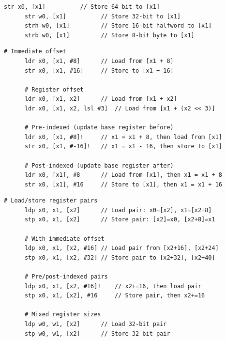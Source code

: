   \begin{definition}
    \label{def:basic-store-operations}
    \begin{lstlisting}[language=arm]
      str x0, [x1]          // Store 64-bit to [x1]
      str w0, [x1]          // Store 32-bit to [x1]
      strh w0, [x1]         // Store 16-bit halfword to [x1]
      strb w0, [x1]         // Store 8-bit byte to [x1]
    \end{lstlisting}
  \end{definition}

  \begin{definition}
    \label{def:addressing-modes}
    \begin{lstlisting}[language=arm]
      # Immediate offset
      ldr x0, [x1, #8]      // Load from [x1 + 8]
      str x0, [x1, #16]     // Store to [x1 + 16]
      
      # Register offset
      ldr x0, [x1, x2]      // Load from [x1 + x2]
      ldr x0, [x1, x2, lsl #3]  // Load from [x1 + (x2 << 3)]
      
      # Pre-indexed (update base register before)
      ldr x0, [x1, #8]!     // x1 = x1 + 8, then load from [x1]
      str x0, [x1, #-16]!   // x1 = x1 - 16, then store to [x1]
      
      # Post-indexed (update base register after)
      ldr x0, [x1], #8      // Load from [x1], then x1 = x1 + 8
      str x0, [x1], #16     // Store to [x1], then x1 = x1 + 16
    \end{lstlisting}
  \end{definition}

  \begin{definition}
    \label{def:pair-load-store-operations}
    \begin{lstlisting}[language=arm]
      # Load/store register pairs
      ldp x0, x1, [x2]      // Load pair: x0=[x2], x1=[x2+8]
      stp x0, x1, [x2]      // Store pair: [x2]=x0, [x2+8]=x1
      
      # With immediate offset
      ldp x0, x1, [x2, #16] // Load pair from [x2+16], [x2+24]
      stp x0, x1, [x2, #32] // Store pair to [x2+32], [x2+40]
      
      # Pre/post-indexed pairs
      ldp x0, x1, [x2, #16]!    // x2+=16, then load pair
      stp x0, x1, [x2], #16     // Store pair, then x2+=16
      
      # Mixed register sizes
      ldp w0, w1, [x2]      // Load 32-bit pair
      stp w0, w1, [x2]      // Store 32-bit pair
    \end{lstlisting}
  \end{definition}

